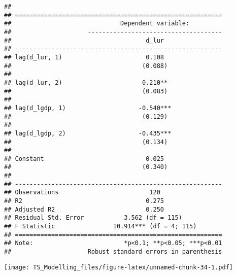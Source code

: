 \documentclass[
]{article}
\newenvironment{Shaded}{\begin{snugshade}}{\end{snugshade}}
\newcommand{\AttributeTok}[1]{\textcolor[rgb]{0.77,0.63,0.00}{#1}}
\newcommand{\DecValTok}[1]{\textcolor[rgb]{0.00,0.00,0.81}{#1}}
\newcommand{\FunctionTok}[1]{\textcolor[rgb]{0.00,0.00,0.00}{#1}}
\newcommand{\NormalTok}[1]{#1}
\newcommand{\SpecialCharTok}[1]{\textcolor[rgb]{0.00,0.00,0.00}{#1}}
\newcommand{\StringTok}[1]{\textcolor[rgb]{0.31,0.60,0.02}{#1}}
\begin{document}
\begin{verbatim}
## 
## =========================================================
##                              Dependent variable:         
##                     -------------------------------------
##                                     d_lur                
## ---------------------------------------------------------
## lag(d_lur, 1)                       0.108                
##                                    (0.088)               
##                                                          
## lag(d_lur, 2)                      0.210**               
##                                    (0.083)               
##                                                          
## lag(d_lgdp, 1)                    -0.540***              
##                                    (0.129)               
##                                                          
## lag(d_lgdp, 2)                    -0.435***              
##                                    (0.134)               
##                                                          
## Constant                            0.025                
##                                    (0.340)               
##                                                          
## ---------------------------------------------------------
## Observations                         120                 
## R2                                  0.275                
## Adjusted R2                         0.250                
## Residual Std. Error           3.562 (df = 115)           
## F Statistic                10.914*** (df = 4; 115)       
## =========================================================
## Note:                         *p<0.1; **p<0.05; ***p<0.01
##                     Robust standard errors in parenthesis
\end{verbatim}

\begin{Shaded}
\end{Shaded}

\texttt{[image: TS\_Modelling\_files/figure-latex/unnamed-chunk-34-1.pdf]}
\end{document}
